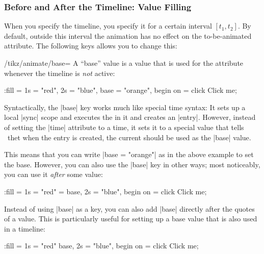 \subsubsection{Before and After the Timeline: Value Filling}

When you specify the timeline, you specify it for a certain interval
$[t_1,t_2]$. By default, outside this interval the animation has no
effect on the to-be-animated attribute. The following keys allows you
to change this:

\begin{key}{/tikz/animate/base=}
  A ``base'' value is a value that is used for the attribute whenever
  the timeline is \emph{not} active:
\begin{codeexample}[animation list = {0.5,1,1.5,2,2.5}]
\tikz \node [fill = green, text = white] :fill =
    { 1s = "red", 2s = "blue", base = "orange", begin on = click }
  {Click me};
\end{codeexample}

  Syntactically, the |base| key works much like special time syntax:
  It sets up a local |sync| scope and executes the  in
  it and creates an |entry|. However, instead of setting the |time|
  attribute to a time, it sets it to a special value that tells
  \tikzname\ thet when the entry is created, the current 
  should be used as the |base| value.

  This means that you can write |base = "orange"| as in the above
  example to set the base. However, you can also use the |base| key in
  other ways; most noticeably, you can use it \emph{after} some value:
\begin{codeexample}[animation list = {0.5,1,1.5,2,2.5}]
\tikz \node [fill = green, text = white] :fill =
    { 1s = {"red" = base}, 2s = "blue", begin on = click }
  {Click me};
\end{codeexample}

  Instead of using |base| as a key, you can also add |base| directly
  after the quotes of a value. This is particularly useful for setting
  up a base value that is also used in a timeline:
\begin{codeexample}[animation list = {0.5,1,1.5,2,2.5}]
\tikz \node [fill = green, text = white] :fill =
    { 1s = "red" base, 2s = "blue", begin on = click }
  {Click me};
\end{codeexample}
\end{key}


